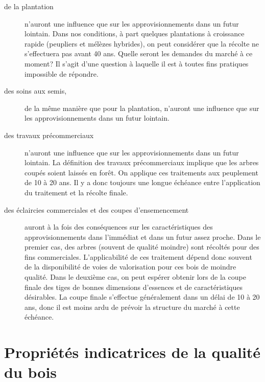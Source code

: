 \begin{description}
	\item[de la plantation] n'auront une influence que sur les approvisionnements dans un futur lointain. Dans nos conditions, à part quelques plantations à croissance rapide (peupliers et mélèzes hybrides), on peut considérer que la récolte ne s'effectuera pas avant 40 ans. Quelle seront les demandes du marché à ce moment? Il s'agit d'une question à laquelle il est à toutes fins pratiques impossible de répondre.
	\item[des soins aux semis,] de la même manière que pour la plantation, n'auront une influence que sur les approvisionnements dans un futur lointain.
	\item[des travaux précommerciaux] n'auront une influence que sur les approvisionnements dans un futur lointain. La définition des travaux précommerciaux implique que les arbres coupés soient laissés en forêt. On applique ces traitements aux peuplement de 10 à 20 ans. Il y a donc toujours une longue échéance entre l'application du traitement et la récolte finale.
	\item[des éclaircies commerciales et des coupes d'ensemencement] auront à la fois des conséquences sur les caractéristiques des approvisionnements dans l'immédiat et dans un futur assez proche. Dans le premier cas, des arbres (souvent de qualité moindre) sont récoltés pour des fins commerciales. L'applicabilité de ces traitement dépend donc souvent de la disponibilité de voies de valorisation pour ces bois de moindre qualité. Dans le deuxième cas, on peut espérer obtenir lors de la coupe finale des tiges de bonnes dimensions d'essences et de caractéristiques désirables. La coupe finale s'effectue généralement dans un délai de 10 à 20 ans, donc il est moins ardu de prévoir la structure du marché à cette échéance. 
\end{description}

\section{Propriétés indicatrices de la qualité du bois}

